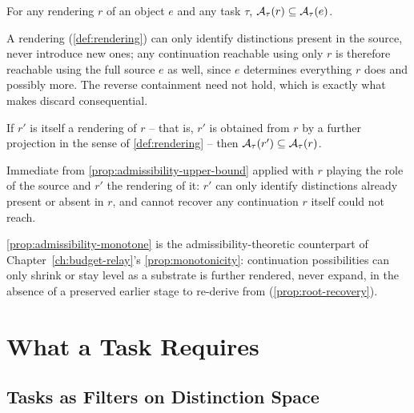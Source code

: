 \begin{proposition}
\label{prop:admissibility-upper-bound}
For any rendering $r$ of an object $e$ and any task $\tau$,
$\mathcal{A}_{\tau}(r) \subseteq \mathcal{A}_{\tau}(e)$.
\end{proposition}

\begin{proofsketch}
A rendering (\cref{def:rendering}) can only identify distinctions present
in the source, never introduce new ones; any continuation reachable using
only $r$ is therefore reachable using the full source $e$ as well, since
$e$ determines everything $r$ does and possibly more. The reverse
containment need not hold, which is exactly what makes discard
consequential.
\end{proofsketch}

\begin{proposition}
\label{prop:admissibility-monotone}
If $r'$ is itself a rendering of $r$ -- that is, $r'$ is obtained from $r$
by a further projection in the sense of \cref{def:rendering} -- then
$\mathcal{A}_{\tau}(r') \subseteq \mathcal{A}_{\tau}(r)$.
\end{proposition}

\begin{proofsketch}
Immediate from \cref{prop:admissibility-upper-bound} applied with $r$
playing the role of the source and $r'$ the rendering of it: $r'$ can only
identify distinctions already present or absent in $r$, and cannot
recover any continuation $r$ itself could not reach.
\end{proofsketch}

\cref{prop:admissibility-monotone} is the admissibility-theoretic
counterpart of Chapter~\ref{ch:budget-relay}'s
\cref{prop:monotonicity}: continuation possibilities can only shrink or
stay level as a substrate is further rendered, never expand, in the
absence of a preserved earlier stage to re-derive from
(\cref{prop:root-recovery}).

\section{What a Task Requires}

\subsection{Tasks as Filters on Distinction Space}


